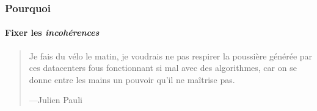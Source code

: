 \begin{frame}
	\frametitle{Pourquoi}
    \framesubtitle{Fixer les \textit{incohérences}}

    \begin{quote}
        Je fais du vélo le matin, je voudrais ne pas respirer la poussière générée
        par ces datacenters fous fonctionnant si mal avec des algorithmes,
        car on se donne entre les mains un pouvoir qu'il ne maîtrise pas.

        \begin{flushright}
            \tiny{---Julien Pauli}
        \end{flushright}
    \end{quote}
\end{frame}


